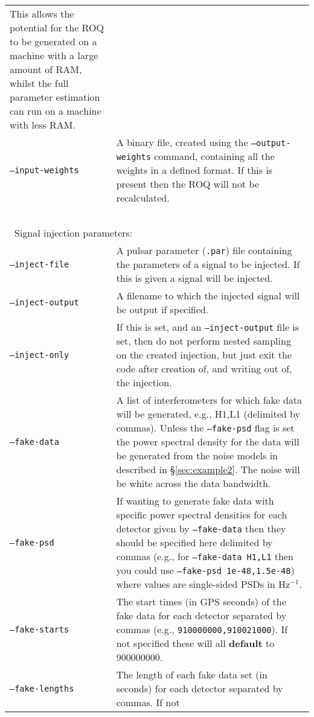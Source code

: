 \begin{footnotesize}
\begin{longtable}{|p{}p{}|}
                            This allows the potential for the ROQ to be generated on a machine with a large amount of RAM, whilst the full parameter
                            estimation can run on a machine with less RAM. \\
 {\tt --input-weights}   &  A binary file, created using the {\tt --output-weights} command, containing all the weights in a defined format.
                            If this is present then the ROQ will not be recalculated. \\
 ~ & ~ \\
\multicolumn{2}{|l|}{~Signal injection parameters:} \\
 {\tt --inject-file}     &  A pulsar parameter ({\tt .par}) file containing the parameters of a signal to be injected. If this is
                           given a signal will be injected. \\
 {\tt --inject-output}   &  A filename to which the injected signal will be output if specified. \\
 {\tt --inject-only}     &  If this is set, and an {\tt --inject-output} file is set, then do not perform nested sampling on the
                            created injection, but just exit the code after creation of, and writing out of, the injection. \\
 {\tt --fake-data}       &  A list of interferometers for which fake data will be generated, e.g., H1,L1 (delimited by commas). Unless
                            the {\tt --fake-psd} flag is set the power spectral density for the data will be generated from the
                            noise models in described in \S\ref{sec:example2}. The noise will be white across the data bandwidth. \\
 {\tt --fake-psd}        &  If wanting to generate fake data with specific power spectral densities for each detector given
                            by {\tt --fake-data} then they should be specified here delimited by commas (e.g., for {\tt --fake-data H1,L1}
                            then you could use {\tt --fake-psd 1e-48,1.5e-48}) where values are single-sided PSDs in Hz$^{-1}$. \\
 {\tt --fake-starts}     &  The start times (in GPS seconds) of the fake data for each detector separated by commas (e.g.,
                            {\tt 910000000,910021000}). If not specified these will all {\bf default} to 900000000. \\
 {\tt --fake-lengths}    &  The length of each fake data set (in seconds) for each detector separated by commas. If not

\end{longtable}
\end{footnotesize}
